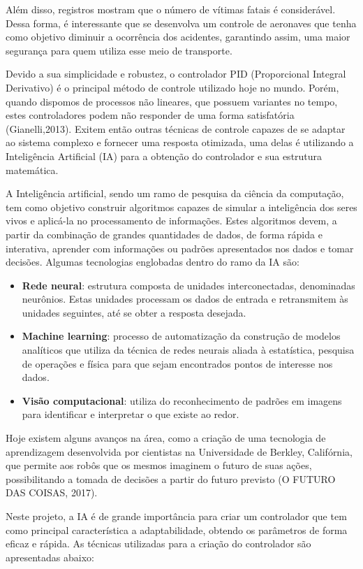 \documentclass[10pt,a4paper]{article}
\numberwithin{equation}{section}
\begin{document}
\par Além disso, registros mostram que o número de vítimas fatais é considerável. Dessa forma, é interessante que se desenvolva um controle de aeronaves que tenha como objetivo diminuir a ocorrência dos acidentes, garantindo assim, uma maior segurança para quem utiliza esse meio de transporte.
\par Devido a sua simplicidade e robustez, o controlador PID (Proporcional Integral Derivativo) é o principal método de controle utilizado hoje no mundo. Porém, quando dispomos de processos não lineares, que possuem variantes no tempo, estes controladores podem não responder de uma forma satisfatória (Gianelli,2013). Exitem então outras técnicas de controle capazes de se adaptar ao sistema complexo e fornecer uma resposta otimizada, uma delas é utilizando a Inteligência Artificial (IA) para a obtenção do controlador e sua estrutura matemática.
\par A Inteligência artificial, sendo um ramo de pesquisa da ciência da computação, tem como objetivo construir algoritmos capazes de simular a inteligência dos seres vivos e aplicá-la no processamento de informações. Estes algoritmos devem, a partir da combinação de grandes quantidades de dados, de forma rápida e interativa, aprender com informações ou padrões apresentados nos dados e tomar decisões. Algumas tecnologias englobadas dentro do ramo da IA são:


\begin{itemize}
\item \textbf{Rede neural}: estrutura composta de unidades interconectadas, denominadas neurônios. Estas unidades processam os dados de entrada e retransmitem às unidades seguintes, até se obter a resposta desejada.
\item \textbf{Machine learning}: processo de automatização da construção de modelos analíticos que utiliza da técnica de redes neurais aliada à estatística, pesquisa de operações e física para que sejam encontrados pontos de interesse nos dados.
\item \textbf{Visão computacional}: utiliza do reconhecimento de padrões em imagens para identificar e interpretar o que existe ao redor.
\end{itemize}

\par Hoje existem alguns avanços na área, como a criação de uma tecnologia de aprendizagem desenvolvida por cientistas na Universidade de Berkley, Califórnia, que permite aos robôs que os mesmos imaginem o futuro de suas ações, possibilitando a  tomada de decisões a partir do futuro previsto (O FUTURO DAS COISAS, 2017).
\par Neste projeto, a IA é de grande importância para criar um controlador que tem como principal característica a adaptabilidade, obtendo os parâmetros de forma eficaz e rápida. As técnicas utilizadas para a criação do controlador são apresentadas abaixo:
\end{document}

